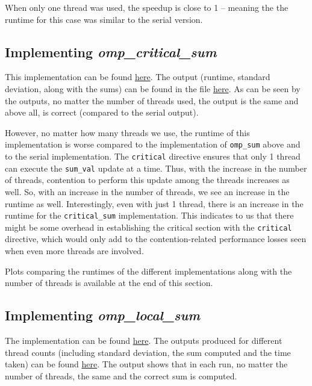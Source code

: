 \documentclass[a4paper,10pt]{article}
\begin{document}
When only one thread was used, the speedup is close to 1 -- meaning the the runtime for this case was similar to the serial version. 

\subsection{Implementing \textit{omp\_critical\_sum}}
This implementation can be found \href{https://github.com/paulmyr/DD2356-MethodsHPC/blob/master/3_open_mp/exercise3/omp_critical_sum.c}{here}. The output (runtime, standard deviation, along with the sums) can be found in the file \href{https://github.com/paulmyr/DD2356-MethodsHPC/blob/master/3_open_mp/exercise3/outputs/omp_critical_output.txt}{here}. As can be seen by the outputs, no matter the number of threads used, the output is the same and above all, is correct (compared to the serial output). 

However, no matter how many threads we use, the runtime of this implementation is worse compared to the implementation of \verb|omp_sum| above and to the serial implementation. The \verb|critical| directive ensures that only 1 thread can execute the \verb|sum_val| update at a time. Thus, with the increase in the number of threads, contention to perform this update among the threads increases as well. So, with an increase in the number of threads, we see an increase in the runtime as well. Interestingly, even with just 1 thread, there is an increase in the runtime for the \verb|critical_sum| implementation. This indicates to us that there might be some overhead in establishing the critical section with the \verb|critical| directive, which would only add to the contention-related performance losses seen when even more threads are involved.

Plots comparing the runtimes of the different implementations along with the number of threads is available at the end of this section.

\subsection{Implementing \textit{omp\_local\_sum}}
The implementation can be found \href{https://github.com/paulmyr/DD2356-MethodsHPC/blob/master/3_open_mp/exercise3/omp_local_sum.c}{here}. The outputs produced for different thread counts (including standard deviation, the sum computed and the time taken) can be found \href{https://github.com/paulmyr/DD2356-MethodsHPC/blob/master/3_open_mp/exercise3/outputs/omp_local_output.txt}{here}. The output shows that in each run, no matter the number of threads, the same and the correct sum is computed. 
\end{document}

